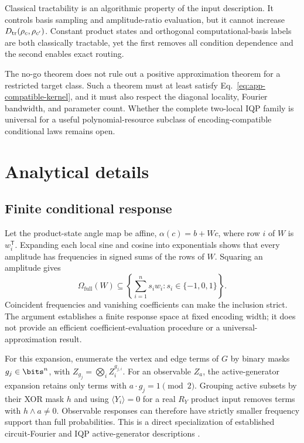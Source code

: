 Classical tractability is an algorithmic property of the input description.
It controls basis sampling and amplitude-ratio evaluation, but it cannot
increase $D_{\rm tr}(\rho_c,\rho_{c'})$. Constant product states and
orthogonal computational-basis labels are both classically tractable, yet the
first removes all condition dependence and the second enables exact routing.

The no-go theorem does not rule out a positive approximation theorem for a
restricted target class. Such a theorem must at least satisfy
Eq.~\eqref{eq:app-compatible-kernel}, and it must also respect the diagonal
locality, Fourier bandwidth, and parameter count. Whether the complete
two-local IQP family is universal for a useful polynomial-resource subclass
of encoding-compatible conditional laws remains open.

\section{Analytical details}
\label{app:analysis}

\subsection{Finite conditional response}

Let the product-state angle map be affine,
$\alpha(c)=b+Wc$, where row $i$ of $W$ is $w_i^{\mathsf T}$. Expanding each
local sine and cosine into exponentials shows that every amplitude has
frequencies in signed sums of the rows of $W$. Squaring an amplitude gives
\begin{equation}
 \Omega_{\mathrm{full}}(W)
 \subseteq
 \left\{\sum_{i=1}^{n}s_iw_i:s_i\in\{-1,0,1\}\right\}.
\end{equation}
Coincident frequencies and vanishing coefficients can make the inclusion
strict. The argument establishes a finite response space at fixed encoding
width; it does not provide an efficient coefficient-evaluation procedure or a
universal-approximation result.

For this expansion, enumerate the vertex and edge terms of $G$ by binary masks
$g_j\in\bits^n$, with $Z_{g_j}=\bigotimes_i Z_i^{g_{j,i}}$. For an observable
$Z_a$, the active-generator expansion retains only terms with
$a\cdot g_j=1\pmod 2$. Grouping active subsets by their XOR
mask $h$ and using $\langle Y_i\rangle=0$ for a real $R_Y$ product input
removes terms with $h\wedge a\ne0$. Observable responses can therefore have
strictly smaller frequency support than full probabilities. This is a direct
specialization of established circuit-Fourier and IQP active-generator
descriptions
\cite{schuldEffectDataEncoding2021,casasMultidimensionalFourier2023,
recio-armengolTrainClassicalDeploy2026}.


